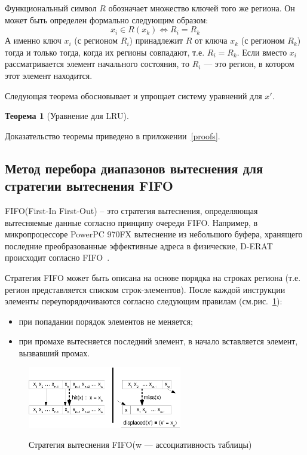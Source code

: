 \documentclass[14pt]{extreport}
\newtheorem{theorem}{Теорема}
\newcommand{\LRU}{\textsf{LRU}\xspace}
\newcommand{\FIFO}{\textsf{FIFO}\xspace}
\begin{document}
Функциональный символ $R$ обозначает множество ключей того же региона. Он может быть определен формально следующим образом:
$$x_i \in R(x_k) \Leftrightarrow R_i = R_k$$
А именно ключ $x_i$ (с регионом $R_i$) принадлежит $R$ от ключа $x_k$ (с регионом $R_k$) тогда и только тогда, когда их регионы совпадают, т.е. $R_i = R_k$. Если вместо $x_i$ рассматривается элемент начального состояния, то $R_i$ --- это регион, в котором этот элемент находится.

Следующая теорема обосновывает и упрощает систему уравнений для $x'$.
\begin{theorem}[Уравнение для \LRU]\label{LRU_equation} \DiapazonLRU
\end{theorem}

Доказательство теоремы приведено в приложении~\ref{proofs}.

\subsection{Метод перебора диапазонов вытеснения для стратегии
вытеснения \FIFO}

\FIFO (First-In First-Out) -- это стратегия вытеснения, определяющая
вытесняемые данные согласно принципу очереди FIFO. Например, в
микропроцессоре PowerPC 970FX вытеснение из небольшого буфера,
хранящего последние преобразованные эффективные адреса в физические,
D-ERAT происходит согласно \FIFO~\cite{PowerPC970FXUserManual}.

Стратегия \FIFO может быть описана на основе порядка на строках
региона (т.е. регион представляется списком строк-элементов). После каждой
инструкции элементы переупорядочиваются согласно следующим правилам
(см.рис.~\ref{fifo1}):
\begin{itemize}
\item при попадании порядок элементов не меняется;
\item при промахе вытесняется последний элемент, в начало вставляется элемент, вызвавший промах.
\end{itemize}

\begin{figure}[h] \center
  \includegraphics[width=0.6\textwidth]{2.theor/fifo1}\\
  \caption{Стратегия вытеснения \FIFO (w --- ассоциативность таблицы)}\label{fifo1}
\end{figure}
\end{document}
